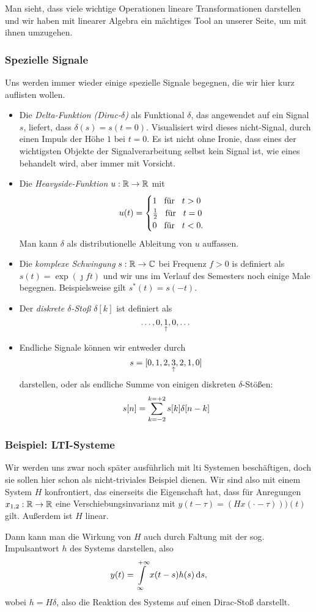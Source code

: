 Man sieht, dass viele wichtige Operationen lineare Transformationen darstellen und wir haben mit linearer Algebra ein m\"achtiges Tool an unserer Seite, um mit ihnen umzugehen.
%
%
\subsubsection{Spezielle Signale}
%
Uns werden immer wieder einige spezielle Signale begegnen, die wir hier kurz auflisten wollen.
\begin{itemize}
    \item Die \emph{Delta-Funktion (Dirac-$\delta$)} als Funktional $\delta$, das angewendet auf ein Signal $s$, liefert, dass $\delta(s) = s(t = 0)$. Visualisiert wird dieses nicht-Signal, durch einen Impuls der H\"ohe $1$ bei $t = 0$. Es ist nicht ohne Ironie, dass eines der wichtigsten Objekte der Signalverarbeitung selbst kein Signal ist, wie eines behandelt wird, aber immer mit Vorsicht.
    \item Die \emph{Heavyside-Funktion} $u : \mathbb{R} \rightarrow \mathbb{R}$ mit
    \[
        u(t) = \begin{cases}
            1 {\hspace{3mm} \text{f\"ur} \hspace{3mm}} t>0 \\
            \frac{1}{2} {\hspace{3mm} \text{f\"ur} \hspace{3mm}} t = 0 \\
            0 {\hspace{3mm} \text{f\"ur} \hspace{3mm}} t < 0.
        \end{cases}
    \]
    Man kann $\delta$ als distributionelle Ableitung von $u$ auffassen.
    \item Die \emph{komplexe Schwingung} $s : \mathbb{R} \rightarrow \mathbb{C}$ bei Frequenz $f > 0$ is definiert als 
        $s(t) = \exp(\jmath f t)$
    und wir uns im Verlauf des Semesters noch einige Male begegnen. Beispielsweise gilt $s^\ast(t) = s(-t)$.
    \item Der \emph{diskrete $\delta$-Sto\ss{}} $\delta[k]$ ist definiert als
    \[\dots, 0, \underset{\uparrow}{1}, 0, \dots\]
    \item Endliche Signale k\"onnen wir entweder durch
    \[
        s = [0,1,2,\underset{\uparrow}{3},2,1,0]
    \]
    darstellen, oder als endliche Summe von einigen diskreten $\delta$-St\"o\ss{}en:
    \[
        s[n] = {\sum\limits_{k=-2}^{k=+2}{s}}[k] \delta[n - k]
    \]
\end{itemize}
%
%
\subsubsection{Beispiel: LTI-Systeme}
Wir werden uns zwar noch sp\"ater ausf\"uhrlich mit \gls{lti} Systemen besch\"aftigen, doch sie sollen hier schon als nicht-triviales Beispiel dienen.
Wir sind also mit einem System $H$ konfrontiert, das einerseits die Eigenschaft hat, dass 
f\"ur Anregungen $x_{1,2} : \mathbb{R} \rightarrow \mathbb{R}$ eine Verschiebungsinvarianz mit $y(t - \tau) = (Hx(\cdot  - \tau)))(t)$ gilt. Au\ss{}erdem ist $H$ linear.

Dann kann man die Wirkung von $H$ auch durch Faltung mit der sog. Impulsantwort $h$ des Systems darstellen, also
\[
    y(t) = {\int\limits_{\infty}^{+\infty}{x(t - s) h(s)}\,\mathrm{d}{s}},
\]
wobei $h = H\delta$, also die Reaktion des Systems auf einen Dirac-Sto\ss{} darstellt.
